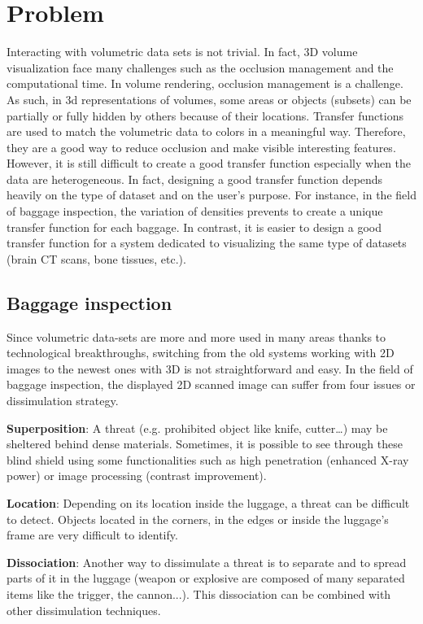  
 \section{Problem}
 
  Interacting with volumetric data sets is not trivial. In fact, 3D volume visualization face many challenges such as the occlusion management and the computational time.
 In volume rendering, occlusion management is a challenge. As such, in 3d representations of volumes, some areas or objects (subsets) can be partially or fully hidden by others because of their locations. Transfer functions are used to match the volumetric data to colors in a meaningful way. Therefore, they are a good way to reduce occlusion and make visible interesting features.  However, it is still difficult to create a good transfer function especially when the data are heterogeneous. In fact, designing a good transfer function depends heavily on the type of dataset and on the user's purpose. For instance, in the field of baggage inspection, the variation of densities prevents to create a unique transfer function for each baggage. In contrast, it is easier to design a good transfer function for a system dedicated to visualizing the same type of datasets (brain CT scans, bone tissues, etc.). 
 
 \subsection{Baggage inspection}
 
  Since volumetric data-sets are more and more used in many areas thanks to technological breakthroughs, switching from the old systems working with 2D images to the newest ones with 3D is not straightforward and easy.  In the field of baggage inspection, the displayed 2D scanned image can suffer from four issues or dissimulation strategy.

\textbf{Superposition}: A threat (e.g. prohibited object like knife, cutter…) may be sheltered behind dense materials. Sometimes, it is possible to see through these blind shield using some functionalities such as high penetration (enhanced X-ray power) or image processing (contrast improvement). 

\textbf{Location}: Depending on its location inside the luggage, a threat can be difficult to detect. Objects located in the corners, in the edges or inside the luggage’s frame are very difficult to identify.

\textbf{Dissociation}: Another way to dissimulate a threat is to separate and to spread parts of it in the luggage (weapon or explosive are composed of many separated items like the trigger, the cannon...). This dissociation can be combined with other dissimulation techniques.

